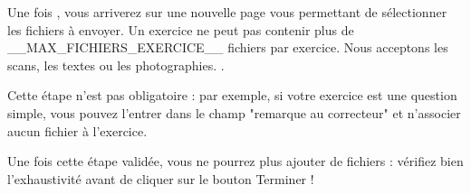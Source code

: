 ﻿Une fois , vous arriverez sur une nouvelle page vous permettant de sélectionner les fichiers à envoyer.
Un exercice ne peut pas contenir plus de __MAX_FICHIERS_EXERCICE__ fichiers par exercice. Nous acceptons les scans, les textes ou les photographies. .

Cette étape n'est pas obligatoire : par exemple, si votre exercice est une question simple, vous pouvez l'entrer dans le champ "remarque au correcteur" et n'associer aucun fichier à l'exercice.

Une fois cette étape validée, vous ne pourrez plus ajouter de fichiers : vérifiez bien l'exhaustivité avant de cliquer sur le bouton Terminer !